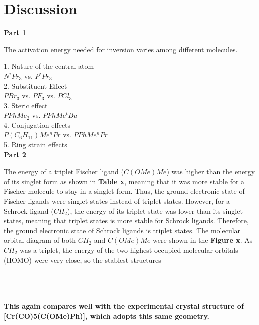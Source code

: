 \documentclass[twocolumn]{article} %
\begin{document}
\section{Discussion}
\textbf{Part 1}

The activation energy needed for inversion varies among different molecules. 

1. Nature of the central atom\\
$N^iPr_3$ vs. $P^iPr_3$\\

2. Substituent Effect\\
$PBr_3$ vs. $PF_3$ vs. $PCl_3$\\

3. Steric effect\\
$PPhMe_2$ vs. $PPhMe^tBu$\\

4. Conjugation effects\\
$P(C_6H_11)Me^nPr$ vs. $PPhMe^nPr$\\

5. Ring strain effects\\



\textbf{Part 2}

The energy of a triplet Fischer ligand ($C(OMe)Me$) was higher than the energy of its singlet form as shown in \textbf{Table x}, meaning that it was more stable for a Fischer molecule to stay in a singlet form. Thus, the ground electronic state of Fischer ligands were singlet states instead of triplet states. However, for a Schrock ligand ($CH_2$), the energy of its triplet state was lower than its singlet states, meaning that triplet states is more stable for Schrock ligands. Therefore, the ground electronic state of Schrock ligands is triplet states. 
The molecular orbital diagram of both $CH_2$ and $C(OMe)Me$ were shown in the \textbf{Figure x}. As $CH_2$ was a triplet, the energy of the two highest occupied molecular orbitals (HOMO)  were very close, so the stablest structures 

\\

\\
\\

\textbf{This again compares well with the experimental crystal structure of [Cr(CO)5(C(OMe)Ph)], which adopts this same geometry.}


\end{document}
